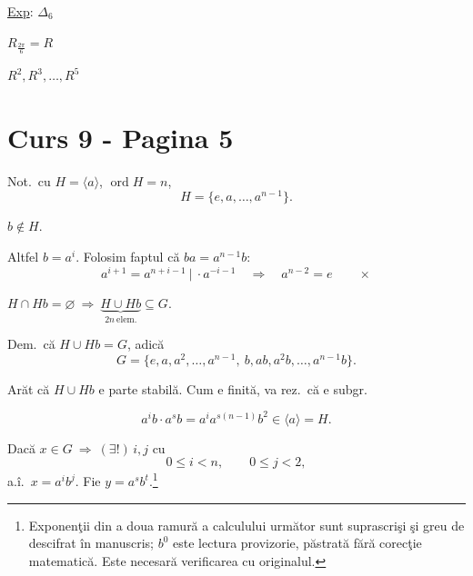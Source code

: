 \bigskip
\bigskip
\noindent\underline{Exp}: \quad $\Delta_6$

\begin{center}
\end{center}

\noindent $R_{\frac{2\pi}{6}} = R$

\noindent $R^2, R^3,\ldots,R^5$





\section*{Curs 9 - Pagina 5}

\noindent Not.\ cu $H=\langle a\rangle$, $\operatorname{ord}H=n$,
\[
H=\{e,a,\ldots,a^{n-1}\}.
\]

\noindent $b\notin H$.

\noindent Altfel $b=a^i$. Folosim faptul că $ba=a^{n-1}b$:
\[
a^{i+1}=a^{n+i-1}\ \big|\ \cdot a^{-i-1}
\quad\Longrightarrow\quad a^{n-2}=e\qquad\times
\]

\bigskip
\noindent $H\cap Hb=\varnothing\ \Longrightarrow\ \underbrace{H\cup Hb}_{2n\ \text{elem.}}\subseteq G$.

\bigskip
\noindent Dem.\ că $H\cup Hb=G$, adică
\[
G=\{e,a,a^2,\ldots,a^{n-1},\ b,ab,a^2b,\ldots,a^{n-1}b\}.
\]

\noindent Arăt că $H\cup Hb$ e parte stabilă. Cum e finită, va rez.\ că e subgr.

\[
a^i b\cdot a^s b=a^i a^{s(n-1)}b^2\in\langle a\rangle=H.
\]

\bigskip
\noindent Dacă $x\in G\ \Longrightarrow\ (\exists!)\,i,j$ cu
\[
0\leq i<n,\qquad 0\leq j<2,
\]
\noindent a.î.\ $x=a^i b^j$. Fie $y=a^s b^t$.\footnote{Exponenţii din a doua ramură a calculului următor sunt suprascrişi şi greu de descifrat în manuscris; $b^0$ este lectura provizorie, păstrată fără corecţie matematică. Este necesară verificarea cu originalul.}


